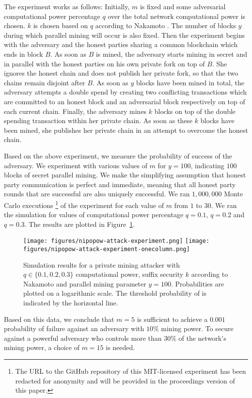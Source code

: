 The experiment works as follows: Initially, $m$ is fixed and some adversarial
computational power percentage $q$ over the total network computational power is
chosen. $k$ is chosen based on $q$ according to Nakamoto \cite{bitcoin}. The
number of blocks $y$ during which parallel mining will occur is also fixed. Then
the experiment begins with the adversary and the honest parties sharing a common
blockchain which ends in block $B$. As soon as $B$ is mined, the adversary
starts mining in secret and in parallel with the honest parties on his own
private fork on top of $B$. She ignores the honest chain and does not publish
her private fork, so that the two chains remain disjoint after $B$. As soon as
$y$ blocks have been mined in total, the adversary attempts a double spend by
creating two conflicting transactions which are committed to an honest block and
an adversarial block respectively on top of each current chain. Finally, the
adversary mines $k$ blocks on top of the double spending transaction within her
private chain. As soon as these $k$ blocks have been mined, she publishes her
private chain in an attempt to overcome the honest chain.

Based on the above experiment, we measure the probability of success of the
adversary. We experiment
with various values of $m$ for $y = 100$, indicating $100$ blocks of secret
parallel mining. We make the simplifying assumption that honest party
communication is perfect and immediate, meaning that all honest party rounds
that are successful are also uniquely successful. We ran $1,000,000$ Monte
Carlo executions \footnote{The URL to the GitHub repository of this
MIT-licensed experiment has been redacted for anonymity and will be provided in
the proceedings version of this paper.} of the experiment for each value of $m$
from $1$ to $30$. We ran the simulation for values of computational power
percentage $q = 0.1$, $q = 0.2$ and $q = 0.3$. The results are plotted in
Figure~\ref{fig.nipopow-attack-experiment}.

\begin{figure}
    \caption{\label{fig.nipopow-attack-experiment}
        Simulation results for a private mining attacker with $q \in \{0.1,
        0.2, 0.3\}$ computational power, suffix security $k$ according to
        Nakamoto and parallel mining parameter $y = 100$. Probabilities are
        plotted on a logarithmic scale. The threshold probability of
        \cite{bitcoin} is indicated by the horizontal line.
    }
    \centering
    \iftwocolumn
        \texttt{[image: figures/nipopow-attack-experiment.png]}
    \else
        \texttt{[image: figures/nipopow-attack-experiment-onecolumn.png]}
    \fi
\end{figure}

Based on this data, we conclude that $m = 5$ is sufficient to achieve a $0.001$
probability of failure against an adversary with $10\%$ mining power. To secure
against a powerful adversary who controls more than $30\%$ of the network's
mining power, a choice of $m = 15$ is needed.
